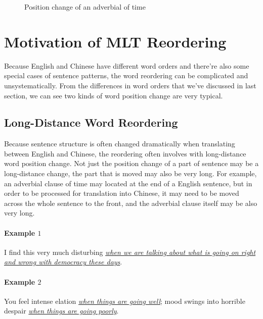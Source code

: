 \begin{figure}[H]
\centering

\caption{Position change of an adverbial of time}
\end{figure}

\section{Motivation of MLT Reordering}
\label{ch:ReorderingApproach:sec:Motivation}

Because English and Chinese have different word orders and there're also some special cases of sentence patterns, the word reordering can be complicated and unsystematically. From the differences in word orders that we've discussed in last section, we can see two kinds of word position change are very typical.

\subsection{Long-Distance Word Reordering}

Because sentence structure is often changed dramatically when translating between English and Chinese, the reordering often involves with long-distance word position change. Not just the position change of a part of sentence may be a long-distance change, the part that is moved may also be very long. For example, an adverbial clause of time may located at the end of a English sentence, but in order to be processed for translation into Chinese, it may need to be moved across the whole sentence to the front, and the adverbial clause itself may be also very long. 

\paragraph{Example $1$}
I find this very much disturbing \emph{\ul{when we are talking about what is going on right and wrong with democracy these days}}.\smallskip\\

\paragraph{Example $2$}
You feel intense elation \emph{\ul{when things are going well}}; mood swings into horrible despair \emph{\ul{when things are going poorly}}.\smallskip\\

